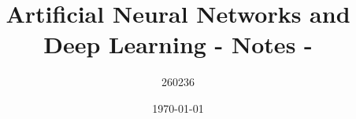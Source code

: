 \author{260236}
\title{Artificial Neural Networks and Deep Learning - Notes - \version}
\date{\printdayoff\today}
\maketitle
